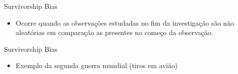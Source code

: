 \begin{frame}	
	\begin{block}{Survivorship Bias}	
		\begin{itemize} 
			\item Ocorre quando as observações estudadas no fim da investigação são não aleatórias em comparação as presentes no começo da observação.		
		\end{itemize}
	\end{block}
\end{frame}


\begin{frame}	
	\begin{block}{Survivorship Bias}	
		\begin{itemize} 
			\item Exemplo da segunda guerra mundial (tiros em avião)
		\end{itemize}
	\end{block}
\end{frame}

